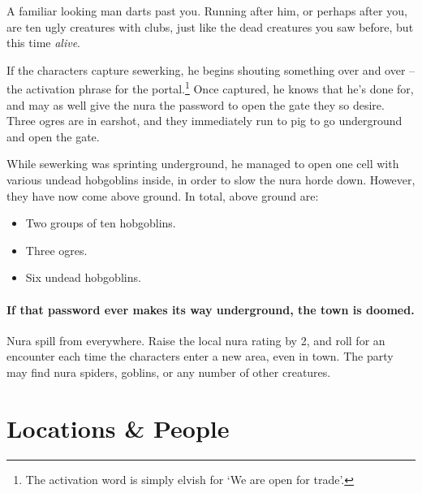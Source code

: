 \begin{multicols}{2}
\begin{speechtext}
	A familiar looking man darts past you.
	Running after him, or perhaps after you, are ten ugly creatures with clubs, just like the dead creatures you saw before, but this time \emph{alive}.

\end{speechtext}


If the characters capture \gls{sewerking}, he begins shouting something over and over -- the activation phrase for the portal.\footnote{The activation word is simply elvish for `We are open for trade'.}
Once captured, he knows that he's done for, and may as well give the nura the password to open the gate they so desire.
Three ogres are in earshot, and they immediately run to \gls{pig} to go underground and open the gate.

While \gls{sewerking} was sprinting underground, he managed to open one cell with various undead hobgoblins inside, in order to slow the nura horde down.  However, they have now come above ground.  In total, above ground are:

\begin{itemize}

	\item{Two groups of ten hobgoblins.}
	\item{Three ogres.}
	\item{Six undead hobgoblins.}

\end{itemize}



\paragraph{If that password ever makes its way underground, the town is doomed.}
Nura spill from everywhere.
Raise the local nura rating by 2, and roll for an encounter each time the characters enter a new area, even in town.
The party may find nura spiders, goblins, or any number of other creatures.

\end{multicols}

\stopcontents[Town]
\stopcontents[sq]

\section{Locations \& People}

